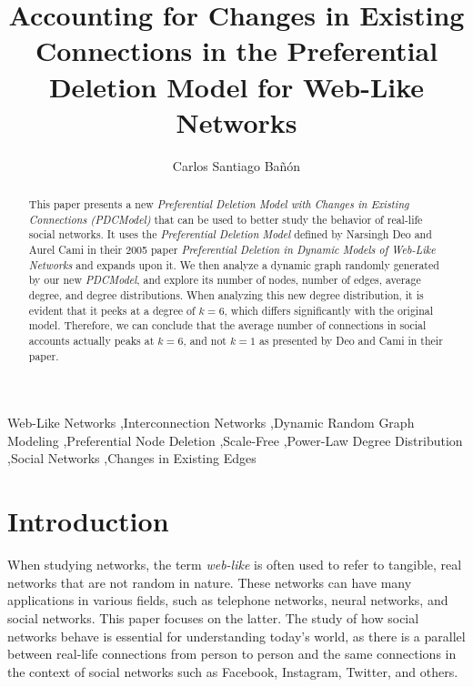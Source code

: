 \documentclass[final,3p,times,twocolumn]{elsarticle}
\begin{document}
\begin{frontmatter}

\title{Accounting for Changes in Existing Connections in the Preferential Deletion Model for Web-Like Networks}
\author{Carlos Santiago Bañón}
\address{College of Engineering and Computer Science - University of Central Florida - Orlando, FL}

\begin{abstract}
This paper presents a new \textit{Preferential Deletion Model with Changes in Existing Connections (PDCModel)} that can be used to better study the behavior of real-life social networks. It uses the \textit{Preferential Deletion Model} defined by Narsingh Deo and Aurel Cami in their 2005 paper \textit{Preferential Deletion in Dynamic Models of Web-Like Networks} and expands upon it. We then analyze a dynamic graph randomly generated by our new \textit{PDCModel}, and explore its number of nodes, number of edges, average degree, and degree distributions. When analyzing this new degree distribution, it is evident that it peeks at a degree of $k = 6$, which differs significantly with the original model. Therefore, we can conclude that the average number of connections in social accounts actually peaks at $k = 6$, and not $k = 1$ as presented by Deo and Cami in their paper.
\end{abstract}

\begin{keyword}
Web-Like Networks \sep Interconnection Networks \sep Dynamic Random Graph Modeling \sep Preferential Node Deletion \sep Scale-Free \sep Power-Law Degree Distribution \sep Social Networks \sep Changes in Existing Edges
\end{keyword}

\end{frontmatter}

\section{Introduction}
\label{S:1}

When studying networks, the term \textit{web-like} is often used to refer to tangible, real networks that are not random in nature. These networks can have many applications in various fields, such as telephone networks, neural networks, and social networks. This paper focuses on the latter. The study of how social networks behave is essential for understanding today's world, as there is a parallel between real-life connections from person to person and the same connections in the context of social networks such as Facebook, Instagram, Twitter, and others.
\end{document}
